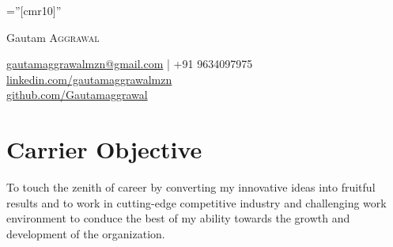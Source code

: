 \documentclass[a4paper,1pt]{article}
\begin{document}

\pagestyle{empty} %

\font\fb=''[cmr10]'' %

\par{\centering
		{\Huge Gautam \textsc{Aggrawal}
		
	}\href{mailto:gautamaggrawalmzn@gmail.com}{gautamaggrawalmzn@gmail.com} | +91 9634097975\\
	\href{https://www.linkedin.com/in/gautamaggrawalmzn/}{linkedin.com/gautamaggrawalmzn}\\
	\href{https://github.com/Gautamaggrawal}{github.com/Gautamaggrawal}\bigskip\par}




\section{Carrier Objective}{}

\begin{flushleft}
To touch the zenith of career by converting my innovative ideas into fruitful results and to work in cutting-edge competitive industry and challenging work  environment to conduce the best of my ability towards the growth and development of the organization.
\end{flushleft}\bigskip\par


\end{document}
